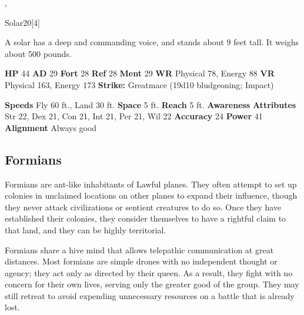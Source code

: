   ,
  \begin{monsubsection}{Solar}{20}[4]
    \vspace{-1em}\vspace{-1em}
    \vspace{0em}

    
          A solar has a deep and commanding voice, and stands about 9 feet tall. It weighs about 500 pounds.
        
    

    \begin{spellcontent}
      \begin{spelltargetinginfo}
        \pari \textbf{HP} 44 \monsep
          \textbf{AD} 29 \monsep
          \textbf{Fort} 28 \monsep
          \textbf{Ref} 28 \monsep
          \textbf{Ment} 29
        \pari \textbf{WR} Physical 78, Energy 88 \monsep
        \textbf{VR} Physical 163, Energy 173
        \pari \textbf{Strike:}
            Greatmace  (19d10 bludgeoning; Impact)
      \end{spelltargetinginfo}
    \end{spellcontent}
    \begin{monsterfooter}
      \pari \textbf{Speeds} Fly 60 ft., Land 30 ft. \monsep
        \textbf{Space} 5 ft. \monsep
        \textbf{Reach} 5 ft.
      \pari \textbf{Awareness} 
      \pari \textbf{Attributes}
        Str 22, Dex 21,
        Con 21, Int 21,
        Per 21, Wil 22
      \pari \textbf{Accuracy} 24 \monsep
        \textbf{Power} 41
      \pari \textbf{Alignment} Always good
    \end{monsterfooter}
  \end{monsubsection}
  
  
  
    \subsection{Formians}
      
    Formians are ant-like inhabitants of Lawful planes.
    They often attempt to set up colonies in unclaimed locations on other planes to expand their influence, though they never attack civilizations or sentient creatures to do so.
    Once they have established their colonies, they consider themselves to have a rightful claim to that land, and they can be highly territorial.

    Formians share a hive mind that allows telepathic communication at great distances.
    Most formians are simple drones with no independent thought or agency; they act only as directed by their queen.
    As a result, they fight with no concern for their own lives, serving only the greater good of the group.
    They may still retreat to avoid expending unnecessary resources on a battle that is already lost.

